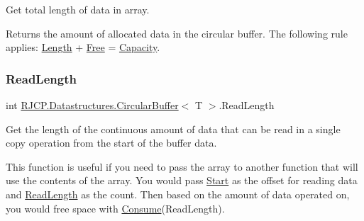Get total length of data in array. 

Returns the amount of allocated data in the circular buffer. The following rule applies\+: \mbox{\hyperlink{class_r_j_c_p_1_1_datastructures_1_1_circular_buffer_a92b47b98334085d7655fd547b8d46c69}{Length}} + \mbox{\hyperlink{class_r_j_c_p_1_1_datastructures_1_1_circular_buffer_a4ce60906784a0ded9d17cc8cfccf846d}{Free}} = \mbox{\hyperlink{class_r_j_c_p_1_1_datastructures_1_1_circular_buffer_a823e88a213f382917ea0f9f9170c14af}{Capacity}}. \mbox{\label{class_r_j_c_p_1_1_datastructures_1_1_circular_buffer_a8d1a90d644b39034c00441161506295a}} 
\subsubsection{\texorpdfstring{ReadLength}{ReadLength}}
{\footnotesize\ttfamily int \mbox{\hyperlink{class_r_j_c_p_1_1_datastructures_1_1_circular_buffer}{R\+J\+C\+P.\+Datastructures.\+Circular\+Buffer}}$<$ T $>$.Read\+Length\hspace{0.3cm}{\ttfamily [get]}}



Get the length of the continuous amount of data that can be read in a single copy operation from the start of the buffer data. 

This function is useful if you need to pass the array to another function that will use the contents of the array. You would pass \mbox{\hyperlink{class_r_j_c_p_1_1_datastructures_1_1_circular_buffer_ae484f7e6b94997f0079b1d826db7debb}{Start}} as the offset for reading data and \mbox{\hyperlink{class_r_j_c_p_1_1_datastructures_1_1_circular_buffer_a8d1a90d644b39034c00441161506295a}{Read\+Length}} as the count. Then based on the amount of data operated on, you would free space with {\ttfamily \mbox{\hyperlink{class_r_j_c_p_1_1_datastructures_1_1_circular_buffer_a80abec3dc79318bb096fd14529cbbb2a}{Consume}}(Read\+Length).} \mbox{\label{class_r_j_c_p_1_1_datastructures_1_1_circular_buffer_ae484f7e6b94997f0079b1d826db7debb}} 
